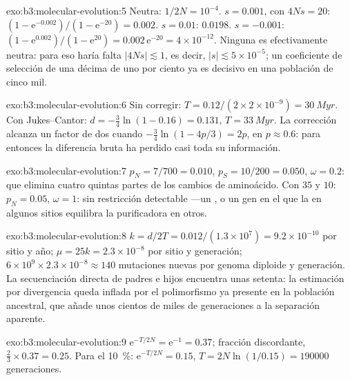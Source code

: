 \begin{solution}{exo:b3:molecular-evolution:5}
Neutra: $1/2N = 10^{-4}$. $s = 0.001$, con $4Ns = 20$: $(1 - \mathrm{e}^{-0.002})/
(1 - \mathrm{e}^{-20}) = 0.002$. $s = 0.01$: $0.0198$. $s = -0.001$: $(1 -
\mathrm{e}^{0.002})/(1 - \mathrm{e}^{20}) = 0.002\,\mathrm{e}^{-20} =
4\times 10^{-12}$. Ninguna es efectivamente neutra: para eso haría falta
$|4Ns|
\lesssim 1$, es decir, $|s| \lesssim 5\times 10^{-5}$; un coeficiente de
selección de una décima de uno por ciento ya es decisivo en una
población de cinco mil.
\end{solution}

\begin{solution}{exo:b3:molecular-evolution:6}
Sin corregir: $T = 0.12/(2\times 2\times 10^{-9}) = \qty{30}{Myr}$. Con
Jukes--Cantor: $d = -\tfrac{3}{4}\ln(1 - 0.16) = 0.131$, $T =
\qty{33}{Myr}$. La corrección alcanza un factor de dos cuando $-\tfrac{3}{4}
\ln(1 - 4p/3) = 2p$, en $p \approx 0.6$: para entonces la diferencia
bruta ha perdido casi toda su información.
\end{solution}

\begin{solution}{exo:b3:molecular-evolution:7}
$p_{N} = 7/700 = 0.010$, $p_{S} = 10/200 = 0.050$, $\omega = 0.2$:
 que elimina cuatro quintas partes de los cambios
de aminoácido. Con $35$ y $10$: $p_{N} = 0.05$, $\omega = 1$: sin
restricción detectable ---un , o un gen en el que la  en algunos sitios equilibra la purificadora en otros.
\end{solution}

\begin{solution}{exo:b3:molecular-evolution:8}
$k = d/2T = 0.012/(1.3\times 10^{7}) = 9.2\times 10^{-10}$ por sitio y
año; $\mu = 25k = 2.3\times 10^{-8}$ por sitio y generación; $6\times
10^{9}\times 2.3\times 10^{-8} \approx 140$ mutaciones nuevas por genoma
diploide y generación. La secuenciación directa de padres e hijos
encuentra unas setenta: la estimación por divergencia queda inflada por
el polimorfismo ya presente en la población ancestral, que añade unos
cientos de miles de generaciones a la separación aparente.
\end{solution}

\begin{solution}{exo:b3:molecular-evolution:9}
$\mathrm{e}^{-T/2N} = \mathrm{e}^{-1} = 0.37$; fracción discordante, $\tfrac{2}{3}
\times 0.37 = 0.25$. Para el \qty{10}{\%}: $\mathrm{e}^{-T/2N} = 0.15$, $T =
2N\ln(1/0.15) = \num{190000}$ generaciones.
\end{solution}

